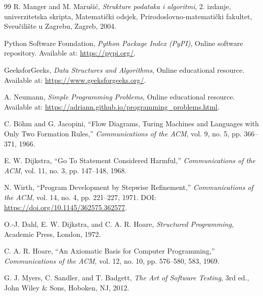 \documentclass[b5paper, utf8, 11pt, colorlinks]{book}
\begin{document}
\begin{thebibliography}{99}
	R. Manger and M. Marušić,
	\textit{Strukture podataka i algoritmi},
	2. izdanje, univerzitetska skripta,
	Matematički odsjek,
	Prirodoslovno-matematički fakultet,
	Sveučilište u Zagrebu, Zagreb, 2004.
	
	
	
	Python Software Foundation,
	\textit{Python Package Index (PyPI)},
	Online software repository.
	Available at:
	\url{https://pypi.org/}.
	
	GeeksforGeeks,
	\textit{Data Structures and Algorithms},
	Online educational resource.
	Available at:
	\url{https://www.geeksforgeeks.org/}.
	
	A. Neumann,
	\textit{Simple Programming Problems},
	Online educational resource.
	Available at:
	\url{https://adriann.github.io/programming_problems.html}.
	
	
	
	C. Böhm and G. Jacopini,
	``Flow Diagrams, Turing Machines and Languages
	with Only Two Formation Rules,''
	\textit{Communications of the ACM},
	vol. 9, no. 5, pp. 366--371, 1966.
	
	E. W. Dijkstra,
	``Go To Statement Considered Harmful,''
	\textit{Communications of the ACM},
	vol. 11, no. 3, pp. 147--148, 1968.
	
	N. Wirth,
	``Program Development by Stepwise Refinement,''
	\textit{Communications of the ACM},
	vol. 14, no. 4, pp. 221--227, 1971.
	DOI: \url{https://doi.org/10.1145/362575.362577}.
	
	O.-J. Dahl, E. W. Dijkstra, and C. A. R. Hoare,
	\textit{Structured Programming},
	Academic Press, London, 1972.
	
	C. A. R. Hoare,
	``An Axiomatic Basis for Computer Programming,''
	\textit{Communications of the ACM},
	vol. 12, no. 10, pp. 576--580, 583, 1969.
	
	
	
	G. J. Myers, C. Sandler, and T. Badgett,
	\textit{The Art of Software Testing},
	3rd ed.,
	John Wiley \& Sons, Hoboken, NJ, 2012.
	

\end{thebibliography}
\end{document}
